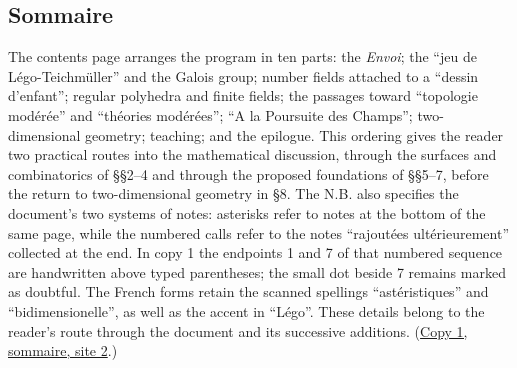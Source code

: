 \documentclass[11pt,a4paper]{article}
\begin{document}
\subsection*{Sommaire}
The contents page arranges the program in ten parts: the \emph{Envoi}; the
``jeu de Légo-Teichmüller'' and the Galois group; number fields attached to a
``dessin d'enfant''; regular polyhedra and finite fields; the passages toward
``topologie modérée'' and ``théories modérées''; ``A la Poursuite des Champs'';
two-dimensional geometry; teaching; and the epilogue. This ordering gives the
reader two practical routes into the mathematical discussion, through the
surfaces and combinatorics of \S\S2--4 and through the proposed foundations of
\S\S5--7, before the return to two-dimensional geometry in \S8. The N.B.
also specifies the document's two systems of notes: asterisks refer to notes
at the bottom of the same page, while the numbered calls refer to the notes
``rajoutées ultérieurement'' collected at the end. In copy 1 the endpoints
1 and 7 of that numbered sequence are handwritten above typed parentheses;
the small dot beside 7 remains marked as doubtful. The French forms retain
the scanned spellings ``astéristiques'' and ``bidimensionelle'', as well as
the accent in ``Légo''. These details belong to the reader's route through
the document and its successive additions.
(\href{https://grothendieck.umontpellier.fr/web/viewer.html?file=../119.pdf\#page=3}{Copy 1, sommaire, site 2}.)
\end{document}

